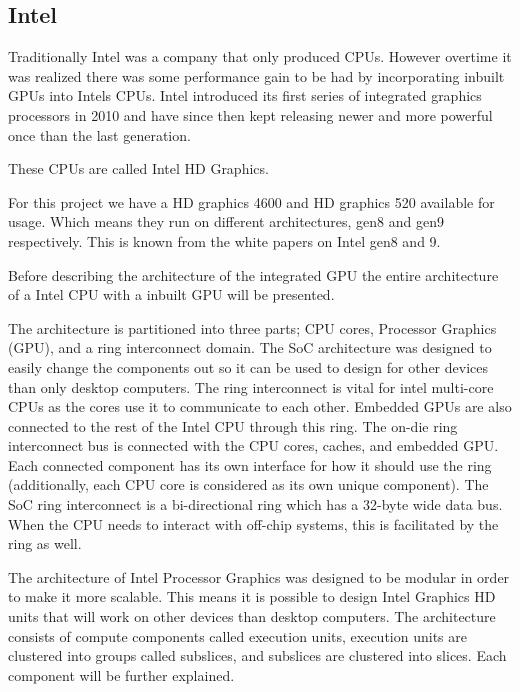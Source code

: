 \subsection{Intel}
Traditionally Intel was a company that only produced \glspl{CPU}. However overtime it was realized there was some performance gain to be had by incorporating inbuilt \glspl{GPU} into Intels \glspl{CPU}.
Intel introduced its first series of integrated graphics processors in 2010 and have since then kept releasing newer and more powerful once than the last generation. 

These \glspl{CPU} are called Intel HD Graphics. 

For this project we have a HD graphics 4600 and HD graphics 520 available for usage. Which means they run on different architectures, gen8 and gen9 respectively. This is known from the white papers on Intel gen8\cite{computegen8} and 9\cite{computegen9}.

Before describing the architecture of the integrated \gls{GPU} the entire architecture of a Intel \gls{CPU} with a inbuilt \gls{GPU} will be presented.


The architecture is partitioned into three parts; \gls{CPU} cores, Processor Graphics (\gls{GPU}), and a ring interconnect domain. 
The \gls{SoC} architecture was designed to easily change the components out so it can be used to design for other devices than only desktop computers.
The ring interconnect is vital for intel multi-core \glspl{CPU} as the cores use it to communicate to each other. 
Embedded \glspl{GPU} are also connected to the rest of the Intel \gls{CPU} through this ring.
The on-die ring interconnect bus is connected with the \gls{CPU} cores, caches, and embedded \gls{GPU}. 
Each connected component has its own interface for how it should use the ring (additionally, each \gls{CPU} core is considered as its own unique component). 
The \gls{SoC} ring interconnect is a bi-directional ring which has a 32-byte wide data bus.  
When the \gls{CPU} needs to interact with off-chip systems, this is facilitated by the ring as well. 

The architecture of Intel Processor Graphics was designed to be modular in order to make it more scalable. 
This means it is possible to design Intel Graphics HD units that will work on other devices than desktop computers. 
The architecture consists of compute components called execution units, execution units are clustered into groups called subslices, and subslices are clustered into slices. 
Each component will be further explained.

